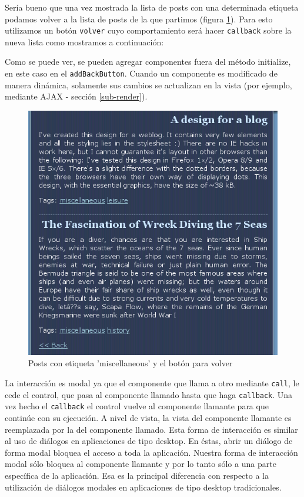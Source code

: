 
Sería bueno que una vez mostrada la lista de posts con una determinada etiqueta podamos volver a la lista de posts de la que partimos (figura \ref{fig-blog2}). Para esto utilizamos un botón \verb"volver" cuyo comportamiento será hacer \verb"callback" sobre la nueva lista como mostramos a continuación:


Como se puede ver, se pueden agregar componentes fuera del método initialize, en este caso en el \verb'addBackButton'. Cuando un componente es modificado de manera dinámica, solamente sus cambios se actualizan en la vista (por ejemplo, mediante AJAX - sección \ref{sub-render}).

\begin{figure}[h]
	\centering
	\includegraphics[scale=0.7]{images/blog2.png}
 	\caption{Posts con etiqueta 'miscellaneous' y el botón para volver}
 	\label{fig-blog2}
\end{figure}

La interacción es modal ya que el componente que llama a otro mediante \verb"call", le cede el control, que pasa al componente llamado hasta que haga \verb'callback'. Una vez hecho el \verb'callback' el control vuelve al componente llamante para que continúe con su ejecución. A nivel de vista, la vista del componente llamante es reemplazada por la del componente llamado. Esta forma de interacción es similar al uso de diálogos en aplicaciones de tipo desktop. En éstas, abrir un diálogo de forma modal bloquea el acceso a toda la aplicación. Nuestra forma de interacción modal sólo bloquea al componente llamante y por lo tanto sólo a una parte específica de la aplicación. Esa es la principal diferencia con respecto a la utilización de diálogos modales en aplicaciones de tipo desktop tradicionales.

